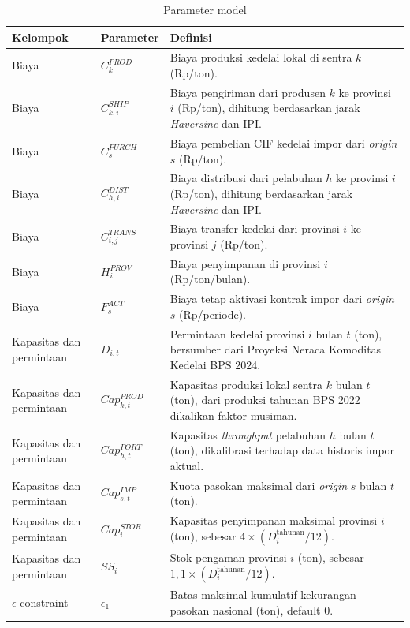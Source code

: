 \documentclass{file/TA-ITS}
\theoremstyle{definition}
\theoremstyle{definition}
\theoremstyle{plain}
\begin{document}
\begin{table}[H]
\centering
\caption{Parameter model}
\label{tab:model_parameters}
\scriptsize
\renewcommand{\arraystretch}{1.06}
\begin{tabularx}{\textwidth}{@{}p{}p{}X@{}}
\toprule
\textbf{Kelompok} & \textbf{Parameter} & \textbf{Definisi} \\
\midrule
Biaya & $C^{PROD}_k$ & Biaya produksi kedelai lokal di sentra $k$ (Rp/ton). \\
Biaya & $C^{SHIP}_{k,i}$ & Biaya pengiriman dari produsen $k$ ke provinsi $i$ (Rp/ton), dihitung berdasarkan jarak \textit{Haversine} dan IPI. \\
Biaya & $C^{PURCH}_s$ & Biaya pembelian CIF kedelai impor dari \textit{origin} $s$ (Rp/ton). \\
Biaya & $C^{DIST}_{h,i}$ & Biaya distribusi dari pelabuhan $h$ ke provinsi $i$ (Rp/ton), dihitung berdasarkan jarak \textit{Haversine} dan IPI. \\
Biaya & $C^{TRANS}_{i,j}$ & Biaya transfer kedelai dari provinsi $i$ ke provinsi $j$ (Rp/ton). \\
Biaya & $H^{PROV}_i$ & Biaya penyimpanan di provinsi $i$ (Rp/ton/bulan). \\
Biaya & $F^{ACT}_s$ & Biaya tetap aktivasi kontrak impor dari \textit{origin} $s$ (Rp/periode). \\
Kapasitas dan permintaan & $D_{i,t}$ & Permintaan kedelai provinsi $i$ bulan $t$ (ton), bersumber dari Proyeksi Neraca Komoditas Kedelai BPS 2024. \\
Kapasitas dan permintaan & $Cap^{PROD}_{k,t}$ & Kapasitas produksi lokal sentra $k$ bulan $t$ (ton), dari produksi tahunan BPS 2022 dikalikan faktor musiman. \\
Kapasitas dan permintaan & $Cap^{PORT}_{h,t}$ & Kapasitas \textit{throughput} pelabuhan $h$ bulan $t$ (ton), dikalibrasi terhadap data historis impor aktual. \\
Kapasitas dan permintaan & $Cap^{IMP}_{s,t}$ & Kuota pasokan maksimal dari \textit{origin} $s$ bulan $t$ (ton). \\
Kapasitas dan permintaan & $Cap^{STOR}_i$ & Kapasitas penyimpanan maksimal provinsi $i$ (ton), sebesar $4 \times (D_i^{\text{tahunan}}/12)$. \\
Kapasitas dan permintaan & $SS_i$ & Stok pengaman provinsi $i$ (ton), sebesar $1{,}1 \times (D_i^{\text{tahunan}}/12)$. \\
\(\epsilon\)-constraint & $\epsilon_1$ & Batas maksimal kumulatif kekurangan pasokan nasional (ton), default 0. \\

\end{tabularx}
\end{table}
\end{document}
